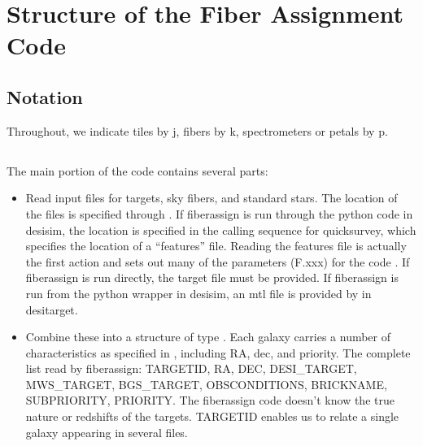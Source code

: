 \documentclass[12pt]{article}
\begin{document}
\section{Structure of the Fiber Assignment Code}
\subsection{Notation}
	Throughout, we indicate tiles by j, fibers by k, spectrometers or petals by p.  

\subsection{}
The main portion of the code contains several parts:
\begin{itemize}
\item Read input files for targets, sky fibers, and standard stars.   The location of the files is specified through .  If fiberassign is run through the python code in desisim, the location is specified in the calling sequence for quicksurvey, which specifies the location of a ``features'' file.  Reading the features file is actually the first action and sets out many of the parameters (F.xxx) for the code .  If fiberassign is run directly, the target file must be provided.  If fiberassign is run from the python wrapper in desisim, an mtl file is provided by  in desitarget.

\item Combine these into a structure of type .  Each galaxy carries a number of characteristics as specified in , including RA, dec, and priority.  
 The complete list read by fiberassign: TARGETID, RA, DEC, DESI\_TARGET, MWS\_TARGET, BGS\_TARGET, OBSCONDITIONS, BRICKNAME, SUBPRIORITY, PRIORITY.  The fiberassign code doesn't know the true nature or redshifts of the targets.   TARGETID enables us to relate a single galaxy appearing in several files.  


\end{itemize}
\end{document}
